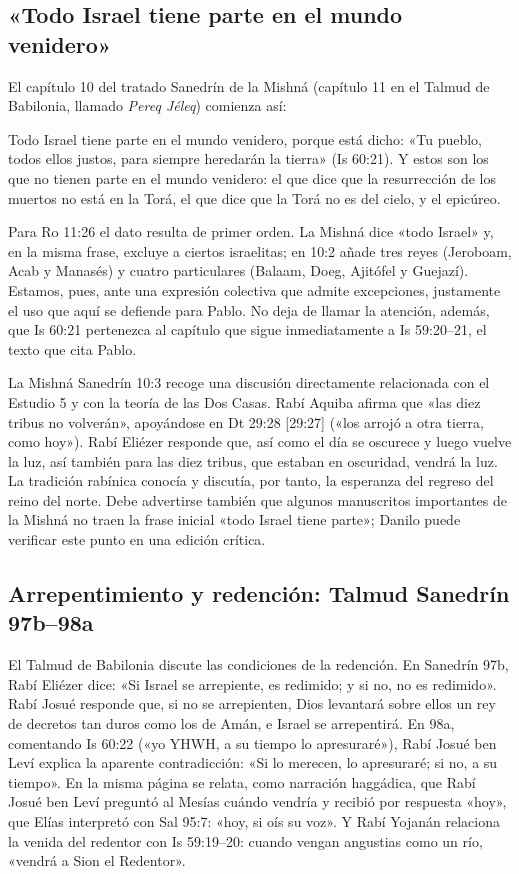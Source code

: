 \subsection{«Todo Israel tiene parte en el mundo venidero»}
El capítulo 10 del tratado Sanedrín de la Mishná (capítulo 11 en el Talmud de Babilonia, llamado \emph{Pereq Jéleq}) comienza así:
\begin{cita}Todo Israel tiene parte en el mundo venidero, porque está dicho: «Tu pueblo, todos ellos justos, para siempre heredarán la tierra» (Is 60:21). Y estos son los que no tienen parte en el mundo venidero: el que dice que la resurrección de los muertos no está en la Torá, el que dice que la Torá no es del cielo, y el epicúreo.\end{cita}
Para Ro 11:26 el dato resulta de primer orden. La Mishná dice «todo Israel» y, en la misma frase, excluye a ciertos israelitas; en 10:2 añade tres reyes (Jeroboam, Acab y Manasés) y cuatro particulares (Balaam, Doeg, Ajitófel y Guejazí). Estamos, pues, ante una expresión colectiva que admite excepciones, justamente el uso que aquí se defiende para Pablo. No deja de llamar la atención, además, que Is 60:21 pertenezca al capítulo que sigue inmediatamente a Is 59:20--21, el texto que cita Pablo.

\begin{nota}
La Mishná Sanedrín 10:3 recoge una discusión directamente relacionada con el Estudio 5 y con la teoría de las Dos Casas. Rabí Aquiba afirma que «las diez tribus no volverán», apoyándose en Dt 29:28 [29:27] («los arrojó a otra tierra, como hoy»). Rabí Eliézer responde que, así como el día se oscurece y luego vuelve la luz, así también para las diez tribus, que estaban en oscuridad, vendrá la luz. La tradición rabínica conocía y discutía, por tanto, la esperanza del regreso del reino del norte. Debe advertirse también que algunos manuscritos importantes de la Mishná no traen la frase inicial «todo Israel tiene parte»; Danilo puede verificar este punto en una edición crítica.
\end{nota}

\subsection{Arrepentimiento y redención: Talmud Sanedrín 97b--98a}
El Talmud de Babilonia discute las condiciones de la redención. En Sanedrín 97b, Rabí Eliézer dice: «Si Israel se arrepiente, es redimido; y si no, no es redimido». Rabí Josué responde que, si no se arrepienten, Dios levantará sobre ellos un rey de decretos tan duros como los de Amán, e Israel se arrepentirá. En 98a, comentando Is 60:22 («yo YHWH, a su tiempo lo apresuraré»), Rabí Josué ben Leví explica la aparente contradicción: «Si lo merecen, lo apresuraré; si no, a su tiempo». En la misma página se relata, como narración haggádica, que Rabí Josué ben Leví preguntó al Mesías cuándo vendría y recibió por respuesta «hoy», que Elías interpretó con Sal 95:7: «hoy, si oís su voz». Y Rabí Yojanán relaciona la venida del redentor con Is 59:19--20: cuando vengan angustias como un río, «vendrá a Sion el Redentor».

